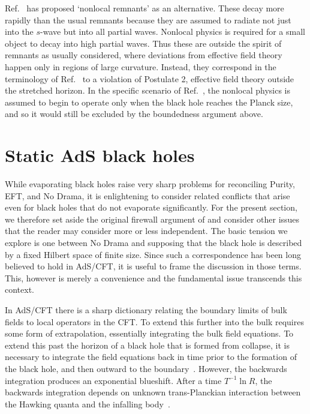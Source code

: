 \documentclass[12pt]{article}
\newcommand{\sect}[1]{\section{#1}\setcounter{equation}{0}}
\begin{document}
{Ref.~\cite{Strominger:2009aj} has proposed `nonlocal remnants' as an alternative.  These decay more rapidly than the usual remnants because they are assumed to radiate not just into the $s$-wave but into all partial waves.  Nonlocal physics is required for a small object to decay into high partial waves.  Thus these are outside the spirit of remnants as usually considered, where deviations from effective field theory happen only in regions of large curvature.  Instead, they correspond in the terminology of Ref.~\cite{Almheiri:2012rt} to a violation of Postulate 2, effective field theory outside the stretched horizon.  In the specific scenario of Ref.~\cite{Strominger:2009aj}, the nonlocal physics is assumed to begin to operate only when the black hole reaches the Planck size, and so it would still be excluded by the boundedness argument above.







\sect{Static AdS black holes}
\label{intF}

While evaporating black holes raise very sharp problems for reconciling
Purity, EFT, and No Drama, it is enlightening to consider related conflicts that arise even for black holes that do not evaporate significantly.  For the present section, we therefore set aside the original firewall argument of \cite{Almheiri:2012rt} and consider other issues that the reader may consider more or less independent.  The basic tension we explore is one between No Drama and supposing that the black hole is described by a fixed Hilbert space of finite size. Since such a correspondence has been long believed to hold in AdS/CFT, it is useful to frame the discussion in those terms.  This, however is merely a convenience and the fundamental issue transcends this context.


In AdS/CFT there is a sharp dictionary relating the boundary limits of bulk fields to local operators in the CFT.  To extend this further into the bulk requires some form of extrapolation, essentially integrating the bulk field equations.  To extend this past the horizon of a black hole that is formed from collapse, it is necessary to integrate the field equations back in time prior to the formation of the black hole, and then outward to the boundary~\cite{Freivogel:2004rd,Heemskerk:2012mn}.  However, the backwards integration produces an exponential blueshift.  After a time $T^{-1} \ln R$, the backwards integration depends on unknown trans-Planckian interaction  between the Hawking quanta and the infalling body~\cite{Susskind:2012uw}.

}
\end{document}
